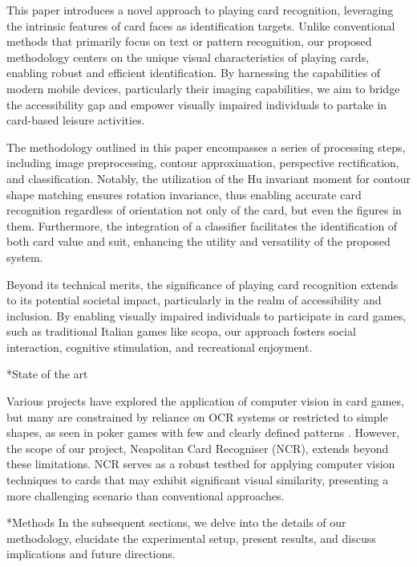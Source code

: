 \documentclass[twocolumn, a4paper,10pt]{article}
\makeatletter
\renewcommand\section{\@startsection{section}{1}{\z@}{3pt}{3pt}{\normalfont\large\bfseries}}
\renewcommand\subsection{\@startsection{subsection}{1}{\z@}{\z@}{\z@}{\normalfont\normalsize\bfseries}}
\renewcommand\subsection{\@startsection{subsection}{1}{\z@}{\z@}{0.1pt}{\normalfont\normalsize\bfseries}}
\makeatother
\begin{document}
This paper introduces a novel approach to playing card recognition, leveraging the intrinsic features of card faces as identification targets. Unlike conventional methods that primarily focus on text or pattern recognition, our proposed methodology centers on the unique visual characteristics of playing cards, enabling robust and efficient identification. By harnessing the capabilities of modern mobile devices, particularly their imaging capabilities, we aim to bridge the accessibility gap and empower visually impaired individuals to partake in card-based leisure activities.

The methodology outlined in this paper encompasses a series of processing steps, including image preprocessing, contour approximation, perspective rectification, and classification. Notably, the utilization of the Hu invariant moment for contour shape matching ensures rotation invariance, thus enabling accurate card recognition regardless of orientation not only of the card, but even the figures in them. Furthermore, the integration of a classifier facilitates the identification of both card value and suit, enhancing the utility and versatility of the proposed system.

Beyond its technical merits, the significance of playing card recognition extends to its potential societal impact, particularly in the realm of accessibility and inclusion. By enabling visually impaired individuals to participate in card games, such as traditional Italian games like scopa, our approach fosters social interaction, cognitive stimulation, and recreational enjoyment.

\subsection*{State of the art}

Various projects have explored the application of computer vision in card games, but many are constrained by reliance on OCR systems \cite{7972274} or restricted to simple shapes, as seen in poker games with few and clearly defined patterns \cite{9563607}. However, the scope of our project, Neapolitan Card Recogniser (NCR), extends beyond these limitations. NCR serves as a robust testbed for applying computer vision techniques to cards that may exhibit significant visual similarity, presenting a more challenging scenario than conventional approaches.

\section*{Methods}
In the subsequent sections, we delve into the details of our methodology, elucidate the experimental setup, present results, and discuss implications and future directions.
\end{document}
